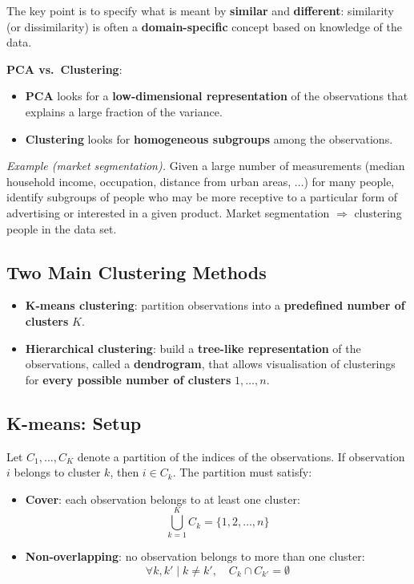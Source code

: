 \documentclass[11pt,a4paper]{article}
\theoremstyle{definition}
\theoremstyle{plain}
\theoremstyle{remark}
\begin{document}
The key point is to specify what is meant by \textbf{similar} and \textbf{different}: similarity (or dissimilarity) is often a \textbf{domain-specific} concept based on knowledge of the data.

\textbf{PCA vs.\ Clustering}:
\begin{itemize}
    \item \textbf{PCA} looks for a \textbf{low-dimensional representation} of the observations that explains a large fraction of the variance.
    \item \textbf{Clustering} looks for \textbf{homogeneous subgroups} among the observations.
\end{itemize}

\textit{Example (market segmentation).} Given a large number of measurements (median household income, occupation, distance from urban areas, $\ldots$) for many people, identify subgroups of people who may be more receptive to a particular form of advertising or interested in a given product. Market segmentation $\Rightarrow$ clustering people in the data set.

\subsection{Two Main Clustering Methods}

\begin{itemize}
    \item \textbf{K-means clustering}: partition observations into a \textbf{predefined number of clusters} $K$.
    \item \textbf{Hierarchical clustering}: build a \textbf{tree-like representation} of the observations, called a \textbf{dendrogram}, that allows visualisation of clusterings for \textbf{every possible number of clusters} $1, \ldots, n$.
\end{itemize}

\subsection{K-means: Setup}

Let $C_1, \ldots, C_K$ denote a partition of the indices of the observations. If observation $i$ belongs to cluster $k$, then $i \in C_k$. The partition must satisfy:
\begin{itemize}
    \item \textbf{Cover}: each observation belongs to at least one cluster:
    \[
        \bigcup_{k=1}^{K} C_k = \{1, 2, \ldots, n\}
    \]
    \item \textbf{Non-overlapping}: no observation belongs to more than one cluster:
    \[
        \forall k, k' \mid k \neq k', \quad C_k \cap C_{k'} = \emptyset
    \]
\end{itemize}
\end{document}
